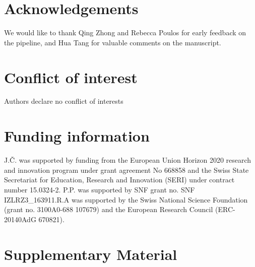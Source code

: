 \documentclass[num-refs]{wiley-article}
\newcommand{\beginsupplement}{%
	\setcounter{table}{0}
	\renewcommand{\thetable}{S\arabic{table}}%
	\setcounter{figure}{0}
	\renewcommand{\thefigure}{S\arabic{figure}}%
}
\begin{document}
\section*{Acknowledgements}
We would like to thank Qing Zhong and Rebecca Poulos for early feedback on the pipeline, and Hua Tang for valuable comments on the manuscript. 

\section*{Conflict of interest}
Authors declare no conflict of interests

\section*{Funding information}
J.Č. was supported by funding from the European Union Horizon 2020 research and innovation program under grant agreement No 668858 and the Swiss State Secretariat for Education, Research and Innovation (SERI) under contract number 15.0324-2. P.P. was supported by SNF grant no. SNF IZLRZ3\_163911.R.A was supported by the Swiss National Science Foundation (grant no. 3100A0-688 107679) and the European Research Council (ERC-20140AdG 670821).

\printendnotes




\newpage
\section{Supplementary Material}
\beginsupplement
\end{document}
